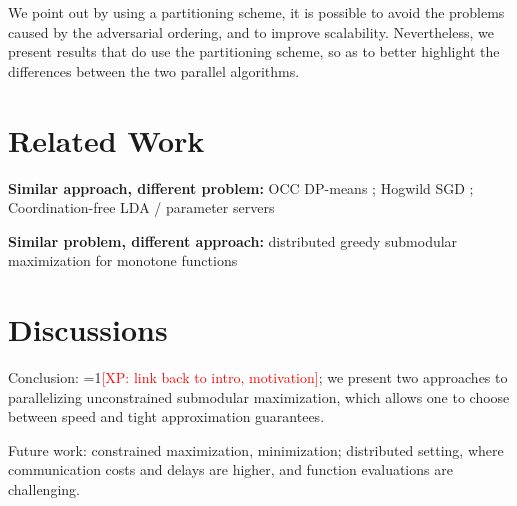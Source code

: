 \documentclass{article} %
\newcommand{\Comments}{1}
\newcommand{\note}[2]{\ifnum\Comments=1\textcolor{#1}{#2}\fi}
\newcommand{\xinghao}[1]{\note{red}{[XP: #1]}}
\begin{document}
We point out by using a partitioning scheme, it is possible to avoid the problems caused by the adversarial ordering, and to improve scalability.
Nevertheless, we present results that do use the partitioning scheme, so as to better highlight the differences between the two parallel algorithms.









\section{Related Work \label{sec:related}}
\textbf{Similar approach, different problem: } OCC DP-means \cite{pan2013}; Hogwild SGD \cite{Recht11}; Coordination-free LDA \cite{Ahmed12} / parameter servers \cite{li2013, ho2013}

\textbf{Similar problem, different approach: } distributed greedy submodular maximization for monotone functions \cite{Mirzasoleiman2013}






\section{Discussions \label{sec:discussions}}

Conclusion: \xinghao{link back to intro, motivation}; we present two approaches to parallelizing unconstrained submodular maximization, which allows one to choose between speed and tight approximation guarantees.

Future work: constrained maximization, minimization; distributed setting, where communication costs and delays are higher, and function evaluations are challenging.


{\footnotesize




}
\end{document}
